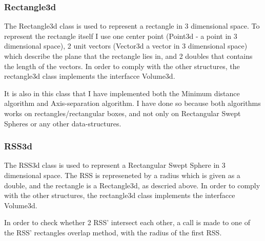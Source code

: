 \subsubsection{Rectangle3d}
\label{rectangle3d}
The Rectangle3d class is used to represent a rectangle in 3 dimensional space. To represent the rectangle itself I use one center point (Point3d - a point in 3 dimensional space), 2 unit vectors (Vector3d a vector in 3 dimensional space) which describe the plane that the rectangle lies in, and 2 doubles that contains the length of the vectors. In order to comply with the other structures, the rectangle3d class implements the interfacce Volume3d.

It is also in this class that I have implemented both the Minimum distance algorithm and Axis-separation algorithm. I have done so because both algorithms works on rectangles/rectangular boxes, and not only on Rectangular Swept Spheres or any other data-structures. 

\subsubsection{RSS3d}
\label{RSS3d}
The RSS3d class is used to represent a Rectangular Swept Sphere in 3 dimensional space. The RSS is represeneted by a radius which is given as a double, and the rectangle is a Rectangle3d, as descried above. In order to comply with the other structures, the rectangle3d class implements the interfacce Volume3d.

In order to check whether 2 RSS' intersect each other, a call is made to one of the RSS' rectangles overlap method, with the radius of the first RSS.

